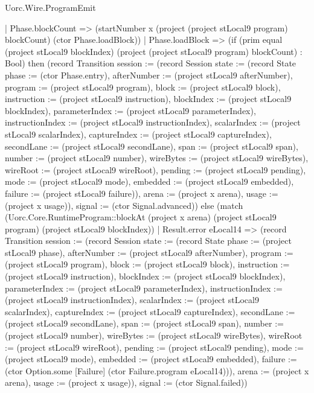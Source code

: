 \begin{lexlean}{Uorc.Wire.ProgramEmit}
\begin{semanticmodule}
{        | Phase.blockCount => (startNumber x (project (project stLocal9 program) blockCount) (ctor Phase.loadBlock))
        | Phase.loadBlock => (if (prim equal (project stLocal9 blockIndex) (project (project stLocal9 program) blockCount) : Bool) then (record Transition {session := (record Session {state := (record State {phase := (ctor Phase.entry), afterNumber := (project stLocal9 afterNumber), program := (project stLocal9 program), block := (project stLocal9 block), instruction := (project stLocal9 instruction), blockIndex := (project stLocal9 blockIndex), parameterIndex := (project stLocal9 parameterIndex), instructionIndex := (project stLocal9 instructionIndex), scalarIndex := (project stLocal9 scalarIndex), captureIndex := (project stLocal9 captureIndex), secondLane := (project stLocal9 secondLane), span := (project stLocal9 span), number := (project stLocal9 number), wireBytes := (project stLocal9 wireBytes), wireRoot := (project stLocal9 wireRoot), pending := (project stLocal9 pending), mode := (project stLocal9 mode), embedded := (project stLocal9 embedded), failure := (project stLocal9 failure)}), arena := (project x arena), usage := (project x usage)}), signal := (ctor Signal.advanced)}) else (match (Uorc.Core.RuntimeProgram::blockAt (project x arena) (project stLocal9 program) (project stLocal9 blockIndex))
          | Result.error eLocal14 => (record Transition {session := (record Session {state := (record State {phase := (project stLocal9 phase), afterNumber := (project stLocal9 afterNumber), program := (project stLocal9 program), block := (project stLocal9 block), instruction := (project stLocal9 instruction), blockIndex := (project stLocal9 blockIndex), parameterIndex := (project stLocal9 parameterIndex), instructionIndex := (project stLocal9 instructionIndex), scalarIndex := (project stLocal9 scalarIndex), captureIndex := (project stLocal9 captureIndex), secondLane := (project stLocal9 secondLane), span := (project stLocal9 span), number := (project stLocal9 number), wireBytes := (project stLocal9 wireBytes), wireRoot := (project stLocal9 wireRoot), pending := (project stLocal9 pending), mode := (project stLocal9 mode), embedded := (project stLocal9 embedded), failure := (ctor Option.some [Failure] (ctor Failure.program eLocal14))}), arena := (project x arena), usage := (project x usage)}), signal := (ctor Signal.failed)})
}
\end{semanticmodule}
\end{lexlean}
